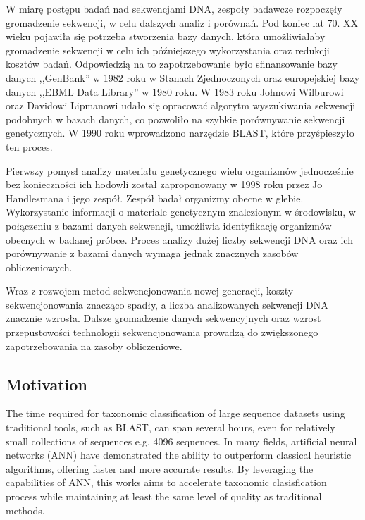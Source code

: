 \documentclass{article}
\begin{document}
{    W miarę postępu badań nad sekwencjami DNA, zespoły badawcze rozpoczęły gromadzenie sekwencji, w celu dalszych analiz i porównań. Pod koniec lat 70. XX wieku pojawiła się potrzeba stworzenia bazy danych, która umożliwiałaby gromadzenie sekwencji w celu ich późniejszego wykorzystania oraz redukcji kosztów badań. Odpowiedzią na to zapotrzebowanie było sfinansowanie bazy danych ,,GenBank'' w 1982 roku w Stanach Zjednoczonych\cite{Bilofsky:1986} oraz europejskiej bazy danych ,,EBML Data Library'' w 1980 roku\cite{Higgins:1992}. W 1983 roku Johnowi Wilburowi oraz Davidowi Lipmanowi udało się opracować algorytm wyszukiwania sekwencji podobnych w bazach danych\cite{Wilbur:1983}, co pozwoliło na szybkie porównywanie sekwencji genetycznych. W 1990 roku wprowadzono narzędzie BLAST\cite{Altschul:1990}, które przyśpieszyło ten proces.

    Pierwszy pomysł analizy materiału genetycznego wielu organizmów jednocześnie bez konieczności ich hodowli został zaproponowany w 1998 roku przez Jo Handlesmana i jego zespół\cite{Handelsman:1998}. Zespół badał organizmy obecne w glebie. Wykorzystanie informacji o materiale genetycznym znalezionym w środowisku, w połączeniu z bazami danych sekwencji, umożliwia  identyfikację organizmów obecnych w badanej próbce. Proces analizy dużej liczby sekwencji DNA oraz ich porównywanie z bazami danych wymaga jednak znacznych zasobów obliczeniowych.

    Wraz z rozwojem metod sekwencjonowania nowej generacji\cite{Reinartz:2002}, koszty sekwencjonowania znacząco spadły, a liczba analizowanych sekwencji DNA znacznie wzrosła\cite{Muir:2016}. Dalsze gromadzenie danych sekwencyjnych oraz wzrost przepustowości technologii sekwencjonowania prowadzą do zwiększonego zapotrzebowania na zasoby obliczeniowe.
            }
        
        \subsection{Motivation}

            The time required for taxonomic classification of large sequence datasets using traditional tools, such as BLAST, can span several hours, even for relatively small collections of sequences e.g. 4096 sequences. In many fields, artificial neural networks (ANN) have demonstrated the ability to outperform classical heuristic algorithms, offering faster and more accurate results. By leveraging the capabilities of ANN, this works aims to accelerate taxonomic clasisfication process while maintaining at least the same level of quality as traditional methods.
\end{document}
